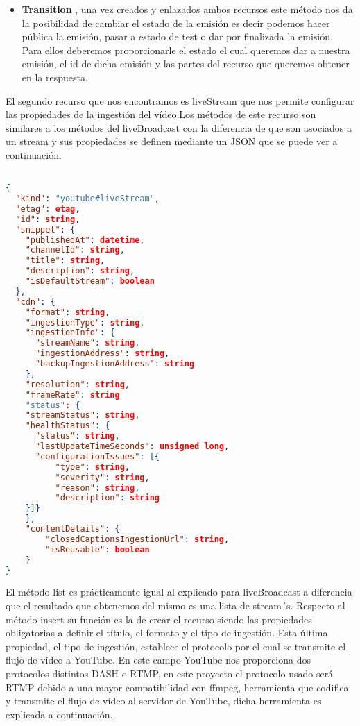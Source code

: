 \begin{itemize}
\item \textbf{Transition} , una vez creados y enlazados ambos recursos este método nos da la posibilidad de cambiar el estado de la emisión es decir podemos hacer pública la emisión, pasar a estado de test o dar por finalizada la emisión. Para ellos deberemos proporcionarle el estado el cual queremos dar a nuestra emisión, el id de dicha emisión y las partes del recurso que queremos obtener en la respuesta.

\end{itemize}


El segundo recurso que nos encontramos es liveStream que nos permite configurar las propiedades de la ingestión del vídeo.Los métodos de este recurso son similares a los métodos del liveBroadcast con la diferencia de que son asociados a un stream y sus propiedades se definen mediante un JSON que se puede ver a continuación.

\begin{lstlisting}[language = JSON]

{
  "kind": "youtube#liveStream",
  "etag": etag,
  "id": string,
  "snippet": {
    "publishedAt": datetime,
    "channelId": string,
    "title": string,
    "description": string,
    "isDefaultStream": boolean
  },
  "cdn": {
    "format": string,
    "ingestionType": string,
    "ingestionInfo": {
      "streamName": string,
      "ingestionAddress": string,
      "backupIngestionAddress": string
    },
    "resolution": string,
    "frameRate": string
    "status": {
    "streamStatus": string,
    "healthStatus": {
      "status": string,
      "lastUpdateTimeSeconds": unsigned long,
      "configurationIssues": [{
          "type": string,
          "severity": string,
          "reason": string,
          "description": string
	}]}
    },
    "contentDetails": {
        "closedCaptionsIngestionUrl": string,
        "isReusable": boolean
    }
}

\end{lstlisting}

El método list es prácticamente igual al explicado para liveBroadcast a diferencia que el resultado que obtenemos del mismo es una lista de stream´s. Respecto al método insert su función es la de crear el recurso siendo las propiedades obligatorias a definir el título, el formato y el tipo de ingestión. Esta última propiedad, el tipo de ingestión,  establece el protocolo por el cual se transmite el flujo de vídeo a YouTube. En este campo YouTube nos proporciona dos protocolos distintos DASH o RTMP, en este proyecto el protocolo usado será RTMP debido a una mayor compatibilidad con ffmpeg, herramienta que codifica y transmite el flujo de vídeo al servidor de YouTube, dicha herramienta es explicada a continuación.

